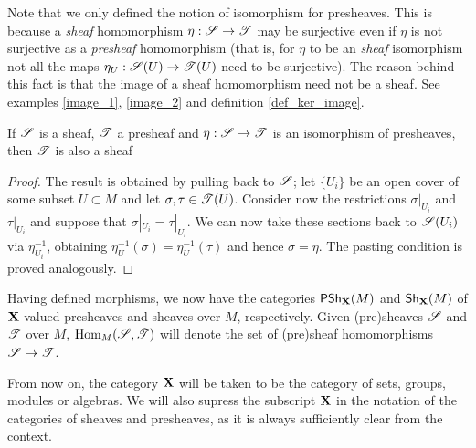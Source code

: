 \begin{obs}
Note that we only defined the notion of isomorphism for presheaves. This is because a \emph{sheaf} homomorphism $\eta :\mathscr{S}\to \mathscr{T}$ may be surjective even if $\eta$ is not surjective as a \emph{presheaf} homomorphism (that is, for $\eta$ to be an \emph{sheaf} isomorphism not all the maps $\eta_U:\mathscr{S}(U)\to \mathscr{T}(U)$ need to be surjective). The reason behind this fact is that the image of a sheaf homomorphism need not be a sheaf. See examples \ref{image_1}, \ref{image_2} and definition \ref{def_ker_image}.
\end{obs}

\begin{lemma}
If $\mathscr{S}$ is a sheaf, $\mathscr{T}$ a presheaf and $\eta :\mathscr{S}\to \mathscr{T}$ is an isomorphism of presheaves, then $\mathscr{T}$ is also a sheaf
\end{lemma}
\begin{proof}
The result is obtained by pulling back to $\mathscr{S}$; let $\{U_i\}$ be an open cover of some subset $U\subset M$ and let $\sigma ,\tau \in \mathscr{T}(U)$. Consider now the restrictions $\sigma |_{U_i}$ and $\tau |_{U_i}$ and suppose that $\sigma |_{U_i}=\tau |_{U_i}$. We can now take these sections back to $\mathscr{S}(U_i)$ via $\eta^{-1}_{U_i}$, obtaining $\eta^{-1}_U(\sigma )=\eta^{-1}_U(\tau )$ and hence $\sigma =\eta$. The pasting condition is proved analogously.
\end{proof}

Having defined morphisms, we now have the categories $\mathsf{PSh}_{\bf X}(M)$ and $\mathsf{Sh}_{\bf X}(M)$ of ${\bf X}$-valued presheaves and sheaves over $M$, respectively. Given (pre)sheaves $\mathscr{S}$ and $\mathscr{T}$ over $M$, $\operatorname{Hom}_M(\mathscr{S},\mathscr{T})$ will denote the set of (pre)sheaf homomorphisms $\mathscr{S}\to \mathscr{T}$.

\begin{obs}
From now on, the category ${\bf X}$ will be taken to be the category of sets, groups, modules or algebras. We will also supress the subscript ${\bf X}$ in the notation of the categories of sheaves and presheaves, as it is always sufficiently clear from the context.
\end{obs} 

